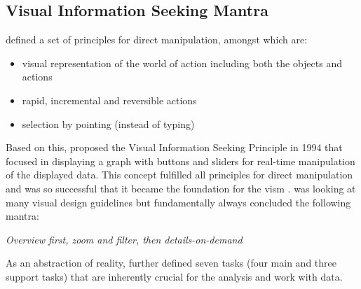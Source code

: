\subsection{Visual Information Seeking Mantra}

\cite{Shneiderman2005} defined a set of principles for direct manipulation, amongst which are:
\begin{itemize}[noitemsep,nolistsep]
	\item visual representation of the world of action including both the objects and actions
	\item rapid, incremental and reversible actions
	\item selection by pointing (instead of typing)
\end{itemize}
Based on this, \cite{Ahlberg1994} proposed the Visual Information Seeking Principle in 1994 that focused in displaying a graph with buttons and sliders for real-time manipulation of the displayed data. This concept fulfilled all principles for direct manipulation and was so successful that it became the foundation for the \gls{vism} \citep{Shneiderman1996}. \cite{Shneiderman1996} was looking at many visual design guidelines but fundamentally always concluded the following mantra:
\begin{framed}
	\textit{Overview first, zoom and filter, then details-on-demand}
\end{framed}
As an abstraction of reality, \cite{Shneiderman1996} further defined seven tasks (four main and three support tasks) that are inherently crucial for the analysis and work with data.

